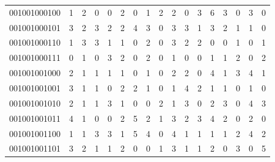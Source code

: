 \documentclass[10pt,a4paper]{article}
\begin{document}
\begin{longtable}{ |c|c|c|c|c|c|c|c|c|c|c|c|c|c|c|c|c| }
    001001000100              & 1                            & 2                                & 0                            & 0                              & 2   & 0   & 1   & 2   & 2   & 0   & 3   & 6   & 3   & 0   & 3   & 0   \\
    001001000101              & 3                            & 2                                & 3                            & 2                              & 2   & 4   & 3   & 0   & 3   & 3   & 1   & 3   & 2   & 1   & 1   & 0   \\
    001001000110              & 1                            & 3                                & 3                            & 1                              & 1   & 0   & 2   & 0   & 3   & 2   & 2   & 0   & 0   & 1   & 0   & 1   \\
    001001000111              & 0                            & 1                                & 0                            & 3                              & 2   & 0   & 2   & 0   & 1   & 0   & 0   & 1   & 1   & 2   & 0   & 2   \\
    001001001000              & 2                            & 1                                & 1                            & 1                              & 1   & 0   & 1   & 0   & 2   & 2   & 0   & 4   & 1   & 3   & 4   & 1   \\
    001001001001              & 3                            & 1                                & 1                            & 0                              & 2   & 2   & 1   & 0   & 1   & 4   & 2   & 1   & 1   & 0   & 1   & 0   \\
    001001001010              & 2                            & 1                                & 1                            & 3                              & 1   & 0   & 0   & 2   & 1   & 3   & 0   & 2   & 3   & 0   & 4   & 3   \\
    001001001011              & 4                            & 1                                & 0                            & 0                              & 2   & 5   & 2   & 1   & 3   & 2   & 3   & 4   & 2   & 0   & 2   & 0   \\
    001001001100              & 1                            & 1                                & 3                            & 3                              & 1   & 5   & 4   & 0   & 4   & 1   & 1   & 1   & 1   & 2   & 4   & 2   \\
    001001001101              & 3                            & 2                                & 1                            & 1                              & 2   & 0   & 0   & 1   & 3   & 1   & 1   & 2   & 0   & 3   & 0   & 5   \\

\end{longtable}
\end{document}
